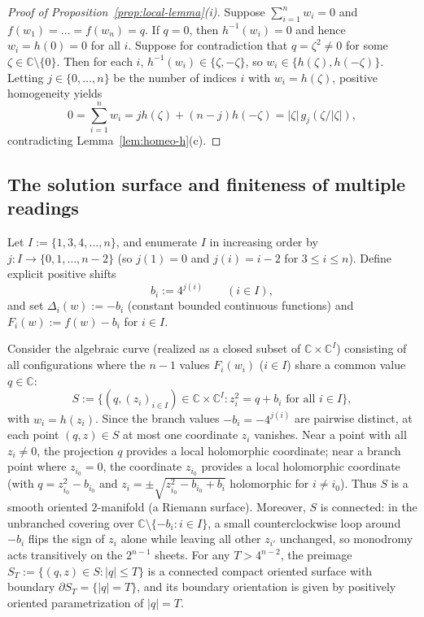 \documentclass[11pt,a4paper]{amsart}
\numberwithin{equation}{section}
\theoremstyle{definition}
\newcommand{\C}{\mathbb{C}}
\begin{document}
\begin{proof}[Proof of Proposition~\ref{prop:local-lemma}(i)]
Suppose $\sum_{i=1}^n w_i = 0$ and $f(w_1) = \dots = f(w_n) = q$. If $q = 0$, then $h^{-1}(w_i) = 0$ and hence $w_i = h(0) = 0$ for all $i$. Suppose for contradiction that $q = \zeta^2 \ne 0$ for some $\zeta \in \C \setminus \{0\}$. Then for each $i$, $h^{-1}(w_i) \in \{\zeta, -\zeta\}$, so $w_i \in \{h(\zeta), h(-\zeta)\}$. Letting $j \in \{0,\dots,n\}$ be the number of indices $i$ with $w_i = h(\zeta)$, positive homogeneity yields
\[
0 = \sum_{i=1}^n w_i = j h(\zeta) + (n-j) h(-\zeta) = |\zeta|\, g_j(\zeta/|\zeta|),
\]
contradicting Lemma~\ref{lem:homeo-h}(c).
\end{proof}

\subsection{The solution surface and finiteness of multiple readings}

Let $I := \{1, 3, 4, \dots, n\}$, and enumerate $I$ in increasing order by $j : I \to \{0, 1, \dots, n-2\}$ (so $j(1) = 0$ and $j(i) = i-2$ for $3 \le i \le n$). Define explicit positive shifts
\[
b_i := 4^{j(i)} \qquad (i \in I),
\]
and set $\Delta_i(w) := -b_i$ (constant bounded continuous functions) and $F_i(w) := f(w) - b_i$ for $i \in I$.

Consider the algebraic curve (realized as a closed subset of $\C \times \C^I$) consisting of all configurations where the $n-1$ values $F_i(w_i)$ ($i \in I$) share a common value $q \in \C$:
\[
S := \bigl\{(q, (z_i)_{i \in I}) \in \C \times \C^I : z_i^2 = q + b_i \text{ for all } i \in I\bigr\},
\]
with $w_i = h(z_i)$. Since the branch values $-b_i = -4^{j(i)}$ are pairwise distinct, at each point $(q, z) \in S$ at most one coordinate $z_i$ vanishes. Near a point with all $z_i \ne 0$, the projection $q$ provides a local holomorphic coordinate; near a branch point where $z_{i_0} = 0$, the coordinate $z_{i_0}$ provides a local holomorphic coordinate (with $q = z_{i_0}^2 - b_{i_0}$ and $z_i = \pm\sqrt{z_{i_0}^2 - b_{i_0} + b_i}$ holomorphic for $i \ne i_0$). Thus $S$ is a smooth oriented $2$-manifold (a Riemann surface). Moreover, $S$ is connected: in the unbranched covering over $\C \setminus \{-b_i : i \in I\}$, a small counterclockwise loop around $-b_i$ flips the sign of $z_i$ alone while leaving all other $z_{i'}$ unchanged, so monodromy acts transitively on the $2^{n-1}$ sheets. For any $T > 4^{n-2}$, the preimage $S_T := \{(q, z) \in S : |q| \le T\}$ is a connected compact oriented surface with boundary $\partial S_T = \{|q| = T\}$, and its boundary orientation is given by positively oriented parametrization of $|q| = T$.
\end{document}

